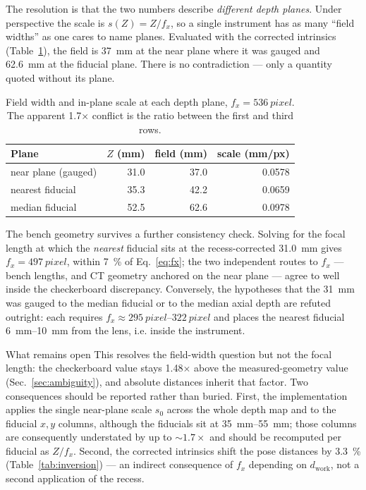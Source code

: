 \documentclass[journal,10pt]{IEEEtran}
\begin{document}
The resolution is that the two numbers describe \emph{different depth planes}.
Under perspective the scale is $s(Z)=Z/f_x$, so a single instrument has as many
``field widths'' as one cares to name planes. Evaluated with the corrected
intrinsics (Table~\ref{tab:planes}), the field is \SI{37}{\milli\metre} at the
near plane where it was gauged and \SI{62.6}{\milli\metre} at the fiducial
plane. There is no contradiction --- only a quantity quoted without its plane.

\begin{table}[t]
\centering
\caption{Field width and in-plane scale at each depth plane, $f_x =
\SI{536}{pixel}$. The apparent \num{1.7}$\times$ conflict is the ratio between
the first and third rows.}
\label{tab:planes}
\footnotesize
\begin{tabular}{@{}lrrr@{}}
\toprule
\textbf{Plane} & $Z$ (mm) & \textbf{field} (mm) & \textbf{scale} (mm/px) \\
\midrule
near plane (gauged)     & 31.0 & 37.0 & 0.0578 \\
nearest fiducial        & 35.3 & 42.2 & 0.0659 \\
median fiducial         & 52.5 & 62.6 & 0.0978 \\
\bottomrule
\end{tabular}
\end{table}

The bench geometry survives a further consistency check. Solving for the focal
length at which the \emph{nearest} fiducial sits at the recess-corrected
\SI{31.0}{\milli\metre} gives $f_x = \SI{497}{pixel}$, within \SI{7}{\percent} of
Eq.~\eqref{eq:fx}; the two independent routes to $f_x$ --- bench lengths, and CT
geometry anchored on the near plane --- agree to well inside the checkerboard
discrepancy. Conversely, the hypotheses that the \SI{31}{\milli\metre} was gauged
to the median fiducial or to the median axial depth are refuted outright: each
requires $f_x \approx \SIrange{295}{322}{pixel}$ and places the nearest fiducial
\SIrange{6}{10}{\milli\metre} from the lens, i.e. inside the instrument.

\begin{notebox}{What remains open}
This resolves the field-width question but not the focal length: the
checkerboard value stays \num{1.48}$\times$ above the measured-geometry value
(Sec.~\ref{sec:ambiguity}), and absolute distances inherit that factor.
Two consequences should be reported rather than buried. First, the implementation
applies the single near-plane scale $s_0$ across the whole depth map and to the
fiducial $x,y$ columns, although the fiducials sit at
\SIrange{35}{55}{\milli\metre}; those columns are consequently understated by up
to ${\sim}1.7\times$ and should be recomputed per fiducial as $Z/f_x$. Second,
the corrected intrinsics shift the pose distances by \SI{3.3}{\percent}
(Table~\ref{tab:inversion}) --- an indirect consequence of $f_x$ depending on
$d_\mathrm{work}$, not a second application of the recess.
\end{notebox}
\end{document}
